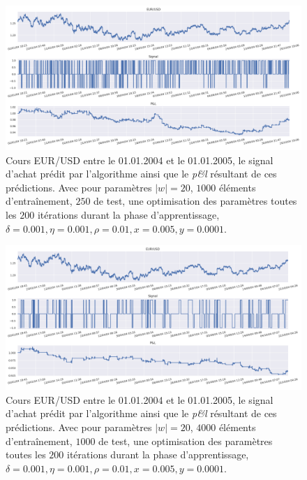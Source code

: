 \documentclass[a4paper, 11pt]{article}
\begin{document}
\begin{figure}
	\centering
	\includegraphics[scale=0.5]{res/eursud_2004-2005_size_1000-250}
	\caption{Cours EUR/USD entre le 01.01.2004 et le 01.01.2005, le signal d'achat prédit par l'algorithme ainsi que le \textit{p\&l} résultant de ces prédictions. Avec pour paramètres $|w| = 20$, $1000$ éléments d'entraînement, $250$ de test, une optimisation des
		paramètres toutes les $200$ itérations durant la phase d'apprentissage, $\delta = 0.001, \eta=0.001,\rho=0.01, x = 0.005, y=0.0001$.}
	\label{eurusd 2004 2005 1M 1000 250}
\end{figure}

\begin{figure}
		\centering
	\includegraphics[scale=0.5]{res/eursud_2004-2005_size_4000-1000}
	\caption{Cours EUR/USD entre le 01.01.2004 et le 01.01.2005, le signal d'achat prédit par l'algorithme ainsi que le \textit{p\&l} résultant de ces prédictions. Avec pour paramètres $|w| = 20$, $4000$ éléments d'entraînement, $1000$ de test, une optimisation des
		paramètres toutes les $200$ itérations durant la phase d'apprentissage, $\delta = 0.001, \eta=0.001,\rho=0.01, x = 0.005, y=0.0001$.}
	\label{eurusd 2004 2005 1M 4000-1000}
\end{figure}
\clearpage
\end{document}

